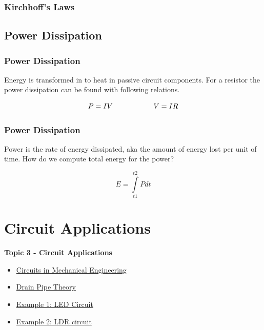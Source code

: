 \documentclass[fleqn]{beamer} %
\newcommand{\sectionIIItitle}{Circuit Applications}
\newcommand{\sectionIIsubsectionIIItitle}{Kirchhoff's Laws}
\newcommand{\sectionIIsubsectionIVtitle}{Power Dissipation}
\newcommand{\sectionIIIsubsectionItitle}{Circuits in Mechanical Engineering}
\newcommand{\sectionIIIsubsectionIItitle}{Drain Pipe Theory}
\newcommand{\sectionIIIsubsectionIIItitle}{Example 1: LED Circuit}
\newcommand{\sectionIIIsubsectionIVtitle}{Example 2: LDR circuit}
\begin{document}
			\begin{frame}
			\frametitle{\sectionIIsubsectionIIItitle}


			\end{frame}

		\subsection{\sectionIIsubsectionIVtitle}\label{sectionIIsubsectionIV}

			\begin{frame}
				\frametitle{\sectionIIsubsectionIVtitle}

				Energy is transformed in to heat in passive circuit components. For a resistor the power dissipation can be found with following relations. \vspace{5mm}
	
				\[P=IV \hspace{20mm} V=IR \]

			\end{frame}

			\begin{frame}
				\frametitle{\sectionIIsubsectionIVtitle}

				Power is the rate of energy dissipated, aka the amount of energy lost per unit of time. How do we compute total energy for the power? 
	
				\[E=\int\limits_{t1}^{t2}Pdt \]  

			\end{frame}
		
	\section{\sectionIIItitle}\label{sectionIII}

		\begin{frame}
			\large \textbf{Topic 3 - \sectionIIItitle} \vspace{3mm}\\

			\begin{itemize}
				\item \hyperlink{sectionIIIsubsectionI}{\sectionIIIsubsectionItitle} \vspc %
				\item \hyperlink{sectionIIIsubsectionII}{\sectionIIIsubsectionIItitle} \vspc %
				\item \hyperlink{sectionIIIsubsectionIII}{\sectionIIIsubsectionIIItitle} \vspc %
				\item \hyperlink{sectionIIIsubsectionIV}{\sectionIIIsubsectionIVtitle} \vspc %
			\end{itemize}

		\end{frame}
\end{document}

